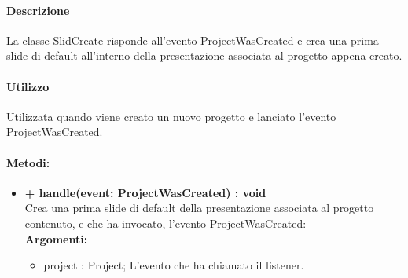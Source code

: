 \paragraph{Descrizione}
La classe SlidCreate risponde all'evento ProjectWasCreated e crea una prima \gls{slide} di default all'interno della presentazione associata al progetto appena creato.

\paragraph{Utilizzo}
Utilizzata quando viene creato un nuovo progetto e lanciato l'evento ProjectWasCreated.

\paragraph{Metodi:}
\begin{itemize}
	\item \textbf{+ handle(event: ProjectWasCreated) : void}\\
	Crea una prima \gls{slide} di default della presentazione associata al progetto contenuto, e che ha invocato, l'evento ProjectWasCreated:\\
	\textbf{Argomenti:}
	\begin{itemize}
		\item project : Project;
		L'evento che ha chiamato il listener.
	\end{itemize}
\end{itemize}
